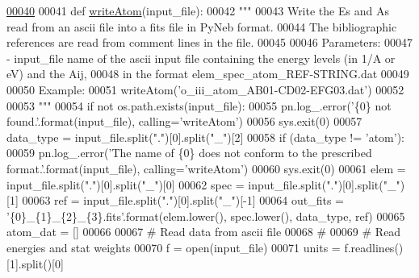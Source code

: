 \begin{DoxyCode}
\hypertarget{namespacepyneb_1_1utils_1_1fits_l00040}{}\hyperlink{namespacepyneb_1_1utils_1_1fits_a8055efc148e2aef26439d0a79a26549b}{00040} 
00041 \textcolor{keyword}{def }\hyperlink{namespacepyneb_1_1utils_1_1fits_a8055efc148e2aef26439d0a79a26549b}{writeAtom}(input\_file):
00042     \textcolor{stringliteral}{""" }
00043 \textcolor{stringliteral}{    Write the Es and As read from an ascii file into a fits file in PyNeb format.}
00044 \textcolor{stringliteral}{    The bibliographic references are read from comment lines in the file.}
00045 \textcolor{stringliteral}{        }
00046 \textcolor{stringliteral}{    Parameters:}
00047 \textcolor{stringliteral}{        - input\_file    name of the ascii input file containing the energy levels (in 1/A or eV) and the
       Aij,}
00048 \textcolor{stringliteral}{                        in the format elem\_spec\_atom\_REF-STRING.dat}
00049 \textcolor{stringliteral}{}
00050 \textcolor{stringliteral}{    Example: }
00051 \textcolor{stringliteral}{    writeAtom('o\_iii\_atom\_AB01-CD02-EFG03.dat')}
00052 \textcolor{stringliteral}{}
00053 \textcolor{stringliteral}{    """}
00054     \textcolor{keywordflow}{if} \textcolor{keywordflow}{not} os.path.exists(input\_file):
00055         pn.log\_.error(\textcolor{stringliteral}{'\{0\} not found.'}.format(input\_file), calling=\textcolor{stringliteral}{'writeAtom'})
00056         sys.exit(0)
00057     data\_type = input\_file.split(\textcolor{stringliteral}{"."})[0].split(\textcolor{stringliteral}{"\_"})[2]
00058     \textcolor{keywordflow}{if} (data\_type != \textcolor{stringliteral}{'atom'}):
00059         pn.log\_.error(\textcolor{stringliteral}{'The name of \{0\} does not conform to the prescribed format.'}.format(input\_file), 
      calling=\textcolor{stringliteral}{'writeAtom'})
00060         sys.exit(0)
00061     elem = input\_file.split(\textcolor{stringliteral}{"."})[0].split(\textcolor{stringliteral}{"\_"})[0]
00062     spec = input\_file.split(\textcolor{stringliteral}{"."})[0].split(\textcolor{stringliteral}{"\_"})[1]
00063     ref = input\_file.split(\textcolor{stringliteral}{"."})[0].split(\textcolor{stringliteral}{"\_"})[-1]
00064     out\_fits = \textcolor{stringliteral}{'\{0\}\_\{1\}\_\{2\}\_\{3\}.fits'}.format(elem.lower(), spec.lower(), data\_type, ref)
00065     atom\_dat = []
00066 
00067     \textcolor{comment}{# Read data from ascii file}
00068     \textcolor{comment}{#}
00069     \textcolor{comment}{# Read energies and stat weights }
00070     f = open(input\_file)
00071     units = f.readlines()[1].split()[0]

\end{DoxyCode}
